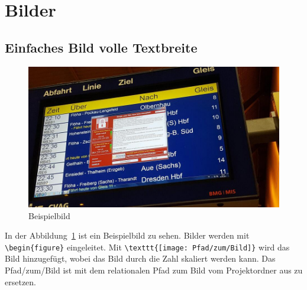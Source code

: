 \section{Bilder}
\subsection{Einfaches Bild volle Textbreite}\label{sec:images-textwidth}

\begin{figure}[!ht]
    \centering
    \includegraphics[width=1.0\textwidth]{images/example}
    \caption{\label{fig:example}Beispielbild\protect
    }
\end{figure}

In der Abbildung~\ref{fig:example} ist ein Beispielbild zu sehen.
Bilder werden mit \lstinline|\begin{figure}| eingeleitet.
Mit \lstinline|\texttt{[image: Pfad/zum/Bild]}| wird 
das Bild hinzugefügt, wobei das Bild durch die Zahl skaliert werden kann.
Das Pfad/zum/Bild ist mit dem relationalen Pfad zum Bild vom Projektordner aus zu ersetzen. 


